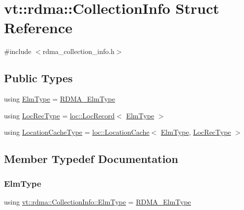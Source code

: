 \hypertarget{structvt_1_1rdma_1_1_collection_info}{}\section{vt\+:\+:rdma\+:\+:Collection\+Info Struct Reference}
\label{structvt_1_1rdma_1_1_collection_info}


{\ttfamily \#include $<$rdma\+\_\+collection\+\_\+info.\+h$>$}

\subsection*{Public Types}
\begin{DoxyCompactItemize}
\item 
using \hyperlink{structvt_1_1rdma_1_1_collection_info_a31cd8d00263f9260a6ca3d8e5cbc19e8}{Elm\+Type} = \hyperlink{namespacevt_a2c2a902092b72056f70210c159f966f0}{R\+D\+M\+A\+\_\+\+Elm\+Type}
\item 
using \hyperlink{structvt_1_1rdma_1_1_collection_info_ad1cd4adc9c3afc0f9fb472033423ee4b}{Loc\+Rec\+Type} = \hyperlink{structvt_1_1location_1_1_loc_record}{loc\+::\+Loc\+Record}$<$ \hyperlink{structvt_1_1rdma_1_1_collection_info_a31cd8d00263f9260a6ca3d8e5cbc19e8}{Elm\+Type} $>$
\item 
using \hyperlink{structvt_1_1rdma_1_1_collection_info_a25a687ebde2ae64ae23dd9a7216071be}{Location\+Cache\+Type} = \hyperlink{structvt_1_1location_1_1_location_cache}{loc\+::\+Location\+Cache}$<$ \hyperlink{structvt_1_1rdma_1_1_collection_info_a31cd8d00263f9260a6ca3d8e5cbc19e8}{Elm\+Type}, \hyperlink{structvt_1_1rdma_1_1_collection_info_ad1cd4adc9c3afc0f9fb472033423ee4b}{Loc\+Rec\+Type} $>$
\end{DoxyCompactItemize}


\subsection{Member Typedef Documentation}
\mbox{\label{structvt_1_1rdma_1_1_collection_info_a31cd8d00263f9260a6ca3d8e5cbc19e8}} 
\subsubsection{\texorpdfstring{Elm\+Type}{ElmType}}
{\footnotesize\ttfamily using \hyperlink{structvt_1_1rdma_1_1_collection_info_a31cd8d00263f9260a6ca3d8e5cbc19e8}{vt\+::rdma\+::\+Collection\+Info\+::\+Elm\+Type} =  \hyperlink{namespacevt_a2c2a902092b72056f70210c159f966f0}{R\+D\+M\+A\+\_\+\+Elm\+Type}}

